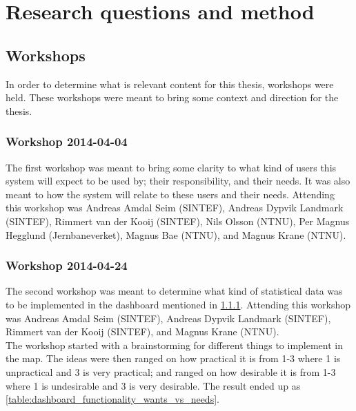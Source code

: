 
\chapter{Research questions and method} %
\label{cha:research_questions_and_method}

\section{Workshops} %
\label{sec:workshops}
In order to determine what is relevant content for this thesis, workshops were
held. These workshops were meant to bring some context and direction for the
thesis. 

\subsection{Workshop 2014-04-04} %
\label{sub:workshop_2014_04_04}
The first workshop was meant to bring some clarity to what kind of users this
system will expect to be used by; their responsibility, and their needs.
It was also meant to how the system will relate to these users and their needs.
Attending this workshop was Andreas Amdal Seim (SINTEF), Andreas Dypvik 
Landmark (SINTEF), Rimmert van der Kooij (SINTEF), Nils Olsson (NTNU), Per 
Magnus Hegglund (Jernbaneverket), Magnus Bae (NTNU), and Magnus Krane (NTNU).


\subsection{Workshop 2014-04-24} %
\label{sub:workshop_2014_04_24}
The second workshop was meant to determine what kind of statistical data was 
to be implemented in the dashboard mentioned in \ref{sub:workshop_2014_04_04}.
Attending this workshop was Andreas Amdal Seim (SINTEF), Andreas Dypvik 
Landmark (SINTEF), Rimmert van der Kooij (SINTEF), and Magnus Krane (NTNU).\\

The workshop started with a brainstorming for different things to implement in
the map. The ideas were then ranged on how practical it is from 1-3 where 1 is
unpractical and 3 is very practical; and ranged on how desirable it is from 1-3
where 1 is undesirable and 3 is very desirable. The result ended up as \ref{table:dashboard_functionality_wants_vs_needs}.

